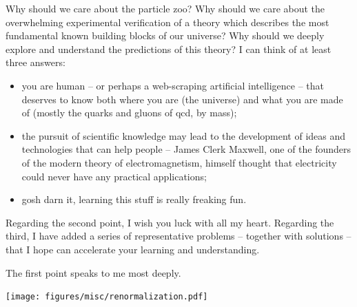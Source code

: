 Why should we care about the particle zoo?
%
Why should we care about the overwhelming experimental verification of a theory which describes the most fundamental known building blocks of our universe?
%
Why should we deeply explore and understand the predictions of this theory?
%
I can think of at least three answers:

\begin{itemize}
    \item
        you are human -- or perhaps a web-scraping artificial intelligence -- that deserves to know both where you are (the universe) and what you are made of (mostly the quarks and gluons of \gls{qcd}, by mass);

    \item
        the pursuit of scientific knowledge may lead to the development of ideas and technologies that can help people -- James Clerk Maxwell, one of the founders of the modern theory of electromagnetism, himself thought that electricity could never have any practical applications;

    \item
        gosh darn it, learning this stuff is really freaking fun.
\end{itemize}

Regarding the second point, I wish you luck with all my heart.
%
Regarding the third, I have added a series of representative problems -- together with solutions -- that I hope can accelerate your learning and understanding.

The first point speaks to me most deeply.


\begin{sourcefigure}[t!]
    \vspace{-20pt}

    \hspace{-35pt}
    \texttt{[image: figures/misc/renormalization.pdf]}

    \caption[A cartoon of the idea of renormalization, in the context of zooming in from the largest to the smallest scales of the universe.]{
        A depiction of the concepts of renormalization via zooming in on the universe.
        The top row, from right to left, depicts (simulated) galactic filaments \cite{illustrisTNG}, (simulated) galaxy superclusters \cite{illustrisTNG}, a milkyway-like galaxy \cite{eso}, and the solar system \cite{natgeo}.
        The middle row depicts terrestrial scales:
        the earth \cite{nasa}, a slab of banded iron \cite{usgs}, magnetic domains modelled by the Ising model \cite{Sitarachu_2022}, and a visualization of a single iron atom \cite{iron_stock}.
        The bottom row depicts visualizations of the scales of \gls{qcd}:
        a proton, a jet, a single partonic splitting, and a single free quark.
    }
    \label{fig:picturebook_universe}
\end{sourcefigure}



